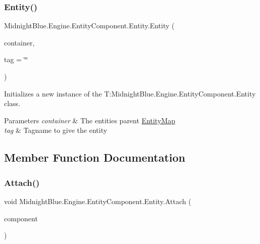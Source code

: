 \subsubsection{\texorpdfstring{Entity()}{Entity()}}
{\footnotesize\ttfamily Midnight\+Blue.\+Engine.\+Entity\+Component.\+Entity.\+Entity (\begin{DoxyParamCaption}\item[{\hyperlink{class_midnight_blue_1_1_engine_1_1_entity_component_1_1_entity_map}{Entity\+Map}}]{container,  }\item[{string}]{tag = {\ttfamily \char`\"{}\char`\"{}} }\end{DoxyParamCaption})\hspace{0.3cm}{\ttfamily [inline]}}



Initializes a new instance of the T\+:\+Midnight\+Blue.\+Engine.\+Entity\+Component.\+Entity class. 


\begin{DoxyParams}{Parameters}
{\em container} & The entities parent \hyperlink{class_midnight_blue_1_1_engine_1_1_entity_component_1_1_entity_map}{Entity\+Map}\\
\hline
{\em tag} & Tagname to give the entity\\
\hline
\end{DoxyParams}


\subsection{Member Function Documentation}
\hypertarget{class_midnight_blue_1_1_engine_1_1_entity_component_1_1_entity_a03dd4fbb29f2a0be51589726304725df}{}\label{class_midnight_blue_1_1_engine_1_1_entity_component_1_1_entity_a03dd4fbb29f2a0be51589726304725df} 
\subsubsection{\texorpdfstring{Attach()}{Attach()}}
{\footnotesize\ttfamily void Midnight\+Blue.\+Engine.\+Entity\+Component.\+Entity.\+Attach (\begin{DoxyParamCaption}\item[{\hyperlink{interface_midnight_blue_1_1_engine_1_1_entity_component_1_1_i_component}{I\+Component}}]{component }\end{DoxyParamCaption})\hspace{0.3cm}{\ttfamily [inline]}}



